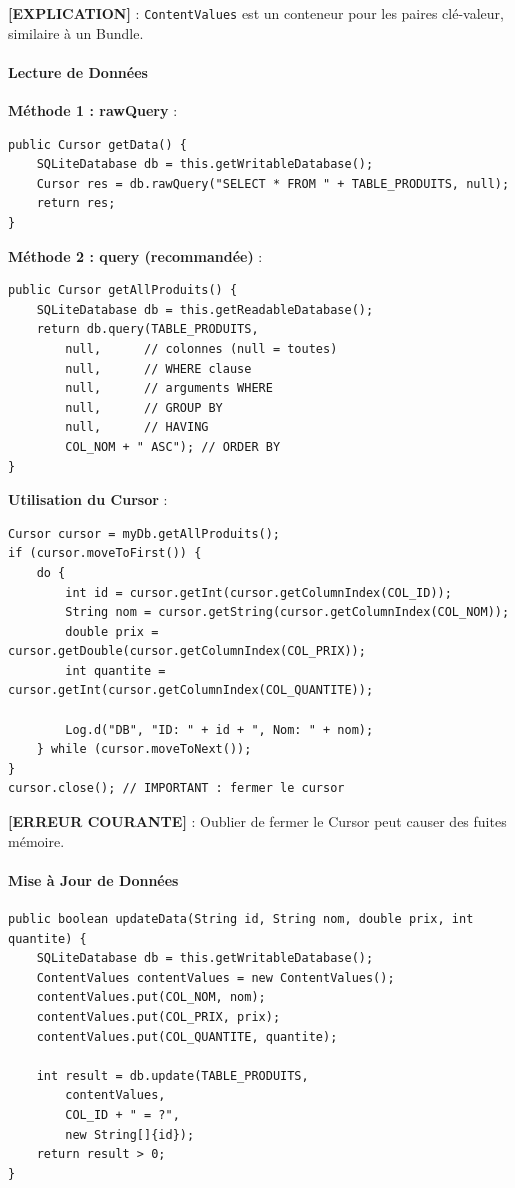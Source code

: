 \documentclass[11pt,a4paper]{article}
\begin{document}
\textbf{[EXPLICATION]} : \texttt{ContentValues} est un conteneur pour les paires clé-valeur, similaire à un Bundle.

\paragraph{Lecture de Données}

\textbf{Méthode 1 : rawQuery} :
\begin{lstlisting}
public Cursor getData() {
    SQLiteDatabase db = this.getWritableDatabase();
    Cursor res = db.rawQuery("SELECT * FROM " + TABLE_PRODUITS, null);
    return res;
}
\end{lstlisting}

\textbf{Méthode 2 : query (recommandée)} :
\begin{lstlisting}
public Cursor getAllProduits() {
    SQLiteDatabase db = this.getReadableDatabase();
    return db.query(TABLE_PRODUITS, 
        null,      // colonnes (null = toutes)
        null,      // WHERE clause
        null,      // arguments WHERE
        null,      // GROUP BY
        null,      // HAVING
        COL_NOM + " ASC"); // ORDER BY
}
\end{lstlisting}

\textbf{Utilisation du Cursor} :
\begin{lstlisting}
Cursor cursor = myDb.getAllProduits();
if (cursor.moveToFirst()) {
    do {
        int id = cursor.getInt(cursor.getColumnIndex(COL_ID));
        String nom = cursor.getString(cursor.getColumnIndex(COL_NOM));
        double prix = cursor.getDouble(cursor.getColumnIndex(COL_PRIX));
        int quantite = cursor.getInt(cursor.getColumnIndex(COL_QUANTITE));
        
        Log.d("DB", "ID: " + id + ", Nom: " + nom);
    } while (cursor.moveToNext());
}
cursor.close(); // IMPORTANT : fermer le cursor
\end{lstlisting}

\textbf{[ERREUR COURANTE]} : Oublier de fermer le Cursor peut causer des fuites mémoire.

\paragraph{Mise à Jour de Données}

\begin{lstlisting}
public boolean updateData(String id, String nom, double prix, int quantite) {
    SQLiteDatabase db = this.getWritableDatabase();
    ContentValues contentValues = new ContentValues();
    contentValues.put(COL_NOM, nom);
    contentValues.put(COL_PRIX, prix);
    contentValues.put(COL_QUANTITE, quantite);
    
    int result = db.update(TABLE_PRODUITS, 
        contentValues, 
        COL_ID + " = ?", 
        new String[]{id});
    return result > 0;
}
\end{lstlisting}
\end{document}

